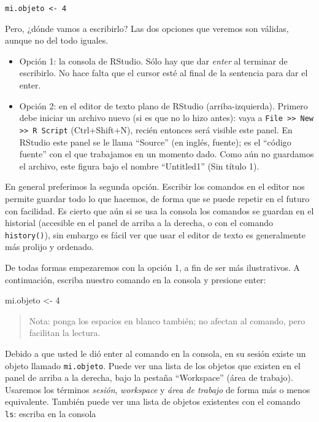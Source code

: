 \documentclass[]{article}
\newenvironment{Shaded}{}{}
\newcommand{\DecValTok}[1]{\textcolor[rgb]{0.25,0.63,0.44}{{#1}}}
\newcommand{\NormalTok}[1]{{#1}}
\begin{document}
\begin{verbatim}
mi.objeto <- 4
\end{verbatim}
Pero, ¿dónde vamos a escribirlo? Las dos opciones que veremos son
válidas, aunque no del todo iguales.

\begin{itemize}
\item
  Opción 1: la consola de RStudio. Sólo hay que dar \emph{enter} al
  terminar de escribirlo. No hace falta que el cursor esté al final de
  la sentencia para dar el enter.
\item
  Opción 2: en el editor de texto plano de RStudio (arriba-izquierda).
  Primero debe iniciar un archivo nuevo (si es que no lo hizo antes):
  vaya a
  \texttt{File \textgreater{}\textgreater{} New \textgreater{}\textgreater{} R Script}
  (Ctrl+Shift+N), recién entonces será visible este panel. En RStudio
  este panel se le llama ``Source'' (en inglés, fuente); es el ``código
  fuente'' con el que trabajamos en un momento dado. Como aún no
  guardamos el archivo, este figura bajo el nombre ``Untitled1'' (Sin
  título 1).
\end{itemize}
En general preferimos la segunda opción. Escribir los comandos en el
editor nos permite guardar todo lo que hacemos, de forma que se puede
repetir en el futuro con facilidad. Es cierto que aún si se usa la
consola los comandos se guardan en el historial (accesible en el panel
de arriba a la derecha, o con el comando \texttt{history()}), sin
embargo es fácil ver que usar el editor de texto es generalmente más
prolijo y ordenado.

De todas formas empezaremos con la opción 1, a fin de ser más
ilustrativos. A continuación, escriba nuestro comando en la consola y
presione enter:

\begin{Shaded}
\begin{Highlighting}[]
\NormalTok{mi.objeto <- }\DecValTok{4}
\end{Highlighting}
\end{Shaded}
\begin{quote}
Nota: ponga los espacios en blanco también; no afectan al comando, pero
facilitan la lectura.

\end{quote}
Debido a que usted le dió enter al comando en la consola, en su sesión
existe un objeto llamado \texttt{mi.objeto}. Puede ver una lista de los
objetos que existen en el panel de arriba a la derecha, bajo la pestaña
``Workspace'' (área de trabajo). Usaremos los términos \emph{sesión},
\emph{workspace} y \emph{área de trabajo} de forma más o menos
equivalente. También puede ver una lista de objetos existentes con el
comando \texttt{ls}: escriba en la consola
\end{document}
